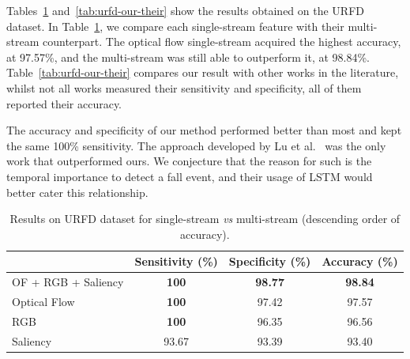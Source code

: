 \documentclass[conference]{IEEEtran}
\begin{document}
Tables~\ref{tab:urfd-ensem} and~\ref{tab:urfd-our-their} show the results obtained on the URFD dataset. In Table~\ref{tab:urfd-ensem}, we compare each single-stream feature with their multi-stream counterpart. The optical flow single-stream acquired the highest accuracy, at 97.57\%, and the multi-stream was still able to outperform it, at 98.84\%. Table~\ref{tab:urfd-our-their} compares our result with other works in the literature, whilst not all works measured their sensitivity and specificity, all of them reported their accuracy.

The accuracy and specificity of our method performed better than most and kept the same 100\% sensitivity. The approach developed by Lu et al.~\cite{lu2019deep} was the only work that outperformed ours. We conjecture that the reason for such is the temporal importance to detect a fall event, and their usage of LSTM would better cater this relationship.

\begin{table}[!htb]
\renewcommand{\tabcolsep}{2.5mm}
\renewcommand{\arraystretch}{1.15}
\centering
\caption{Results on URFD dataset for single-stream \textit{vs} multi-stream (descending order of accuracy).}
\label{tab:urfd-ensem}
\begin{tabular}{lccc}
\toprule
 & Sensitivity (\%) & Specificity (\%) & Accuracy (\%) \\
 \midrule
 OF + RGB + Saliency & \textbf{100} & \textbf{98.77} & \textbf{98.84} \\
 Optical Flow        & \textbf{100} & 97.42          & 97.57          \\
 RGB                 & \textbf{100} & 96.35          & 96.56          \\
 Saliency            & 93.67        & 93.39          & 93.40          \\
 \bottomrule
\end{tabular}
\end{table}
\end{document}
